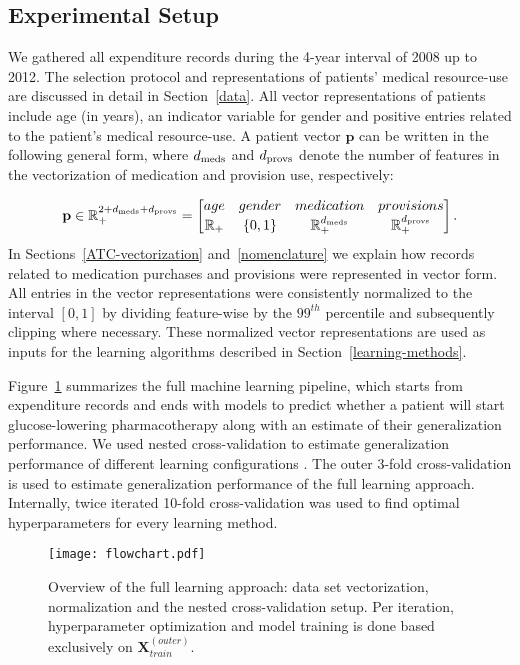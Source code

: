 \documentclass[twoside,11pt]{article}
\newcommand{\dmeds}{d_{\rm meds}}
\newcommand{\dprovs}{d_{\rm provs}}
\begin{document}
\subsection{Experimental Setup} \label{setup}
We gathered all expenditure records during the 4-year interval of 2008 up to 2012. The selection protocol and representations of patients' medical resource-use are discussed in detail in Section~\ref{data}. All vector representations of patients include age (in years), an indicator variable for gender and positive entries related to the patient's medical resource-use. A patient vector $\mathbf{p}$ can be written in the following general form, where $\dmeds$ and $\dprovs$ denote the number of features in the vectorization of medication and provision use, respectively:

\begin{equation}
\mathbf{p} \in \mathbb{R}^{2 + \dmeds + \dprovs}_+ = 
\begin{bmatrix} 
age 		& gender 	& medication		& provisions  \\
\mathbb{R}_+	& \{0, 1\}	& \mathbb{R}^{\dmeds}_+	& \mathbb{R}^{\dprovs}_+ 
\end{bmatrix}.
\end{equation}
In Sections~\ref{ATC-vectorization} and~\ref{nomenclature} we explain how records related to medication purchases and provisions were represented in vector form. All entries in the vector representations were consistently normalized to the interval $[0, 1]$ by dividing feature-wise by the $99^{th}$ percentile and subsequently clipping where necessary. These normalized vector representations are used as inputs for the learning algorithms described in Section~\ref{learning-methods}.

Figure~\ref{fig:flowchart} summarizes the full machine learning pipeline, which starts from expenditure records and ends with models to predict whether a patient will start glucose-lowering pharmacotherapy along with an estimate of their generalization performance. We used nested cross-validation to estimate generalization performance of different learning configurations \citep{varma2006bias}. The outer 3-fold cross-validation is used to estimate generalization performance of the full learning approach. Internally, twice iterated 10-fold cross-validation was used to find optimal hyperparameters for every learning method.

\begin{figure}[!h]
  \centering
  \texttt{[image: flowchart.pdf]}
  \caption{Overview of the full learning approach: data set vectorization, normalization and the nested cross-validation setup. Per iteration, hyperparameter optimization and model training is done based exclusively on $\mathbf{X}_{train}^{(outer)}$.} 
  \label{fig:flowchart}
\end{figure}
\end{document}
